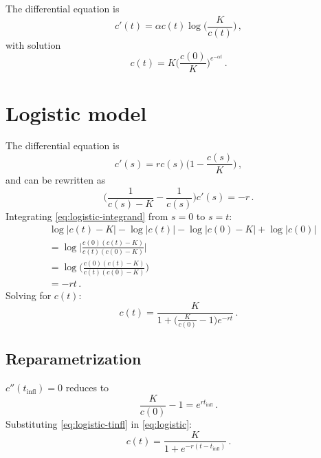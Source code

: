 \documentclass[12pt]{article}
\begin{document}
The differential equation is
%
\begin{equation}
  c'(t) = \alpha c(t) \log \bigg(\frac{K}{c(t)}\bigg)\,,
\end{equation}
%
with solution
%
\begin{equation}
  \label{eq:gompertz}
  c(t) = K \bigg(\frac{c(0)}{K}\bigg)^{e^{-\alpha t}}\,.
\end{equation}


\section{Logistic model}

The differential equation is
%
\begin{equation}
  c'(s) = r c(s) \bigg(1 - \frac{c(s)}{K}\bigg)\,,
\end{equation}
%
and can be rewritten as
%
\begin{equation}
  \label{eq:logistic-integrand}
  \bigg(\frac{1}{c(s) - K} - \frac{1}{c(s)}\bigg) c'(s) = -r\,.
\end{equation}
%
Integrating \eqref{eq:logistic-integrand} from $s = 0$ to $s = t$:
%
\begin{equation}
  \begin{aligned}
    &\log|c(t) - K| - \log|c(t)| - \log|c(0) - K| + \log|c(0)| \\
    &= \log\bigg|\frac{c(0) (c(t) - K)}{c(t) (c(0) - K)}\bigg| \\
    &= \log\bigg(\frac{c(0) (c(t) - K)}{c(t) (c(0) - K)}\bigg) \\
    &= -rt\,.
  \end{aligned}
\end{equation}
%
Solving for $c(t)$:
%
\begin{equation}
  \label{eq:logistic}
  c(t) = \frac{K}{1 + \big(\frac{K}{c(0)} - 1\big) e^{-r t}}\,.
\end{equation}

\subsection{Reparametrization}

$c''(t_\text{infl}) = 0$ reduces to
%
\begin{equation}
  \label{eq:logistic-tinfl}
  \frac{K}{c(0)} - 1 = e^{r t_\text{infl}}\,.
\end{equation}
%
Substituting \eqref{eq:logistic-tinfl} in \eqref{eq:logistic}:
%
\begin{equation}
  c(t) = \frac{K}{1 + e^{-r (t - t_\text{infl})}}\,.
\end{equation}
\end{document}
